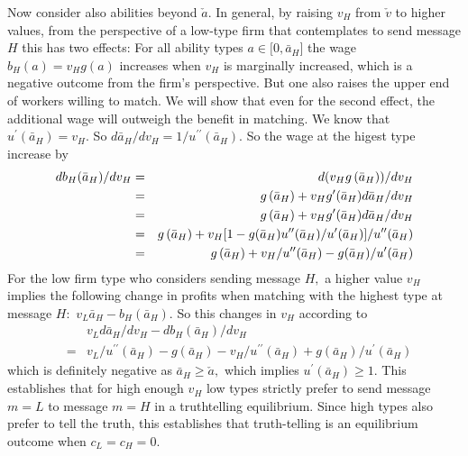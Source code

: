 \documentclass[12pt]{article}
\begin{document}
Now consider also abilities beyond $\check{a}.$ In general, by raising $%
v_{H} $ from $\check{v}$ to higher values, from the perspective of a
low-type firm that contemplates to send message $H$ this has two effects:
For all ability types $a\in \lbrack 0,\bar{a}_{H}]$ the wage $%
b_{H}(a)=v_{H}g(a)$ increases when $v_{H}$ is marginally increased, which is
a negative outcome from the firm's perspective. But one also raises the
upper end of workers willing to match. We will show that even for the second
effect, the additional wage will outweigh the benefit in matching. We know
that $u^{\prime }(\bar{a}_{H})=v_{H}.$ So $d\bar{a}_{H}/dv_{H}=1/u^{\prime
\prime }(\bar{a}_{H}).$ So the wage at the higest type increase by 
\begin{eqnarray*}
db_{H}(\bar{a}_{H})/dv_{H} &=&d(v_{H}g\left( \bar{a}_{H}\right) )/dv_{H} \\
&=&g\left( \bar{a}_{H}\right) +v_{H}g^{\prime }(\bar{a}_{H})d\bar{a}%
_{H}/dv_{H} \\
&=&g\left( \bar{a}_{H}\right) +v_{H}g^{\prime }(\bar{a}_{H})d\bar{a}%
_{H}/dv_{H} \\
&=&g\left( \bar{a}_{H}\right) +v_{H}[1-g(\bar{a}_{H})u^{\prime \prime }(\bar{%
a}_{H})/u^{\prime }(\bar{a}_{H})]/u^{\prime \prime }(\bar{a}_{H}) \\
&=&g\left( \bar{a}_{H}\right) +v_{H}/u^{\prime \prime }(\bar{a}_{H})-g(\bar{a%
}_{H})/u^{\prime }(\bar{a}_{H})
\end{eqnarray*}%
For the low firm type who considers sending message $H,$ a higher value $%
v_{H}$ implies the following change in profits when matching with the
highest type at message $H:$ $v_{L}\bar{a}_{H}-b_{H}(\bar{a}_{H}).$ So this
changes in $v_{H}$ according to 
\begin{eqnarray*}
&&v_{L}d\bar{a}_{H}/dv_{H}-db_{H}(\bar{a}_{H})/dv_{H} \\
&=&v_{L}/u^{\prime \prime }(\bar{a}_{H})-g\left( \bar{a}_{H}\right)
-v_{H}/u^{\prime \prime }(\bar{a}_{H})+g(\bar{a}_{H})/u^{\prime }(\bar{a}%
_{H})
\end{eqnarray*}%
which is definitely negative as $\bar{a}_{H}\geq \check{a},$ which implies $%
u^{\prime }(\bar{a}_{H})\geq 1.$ This establishes that for high enough $%
v_{H} $ low types strictly prefer to send message $m=L$ to message $m=H$ in
a truthtelling equilibrium. Since high types also prefer to tell the truth,
this establishes that truth-telling is an equilibrium outcome when $%
c_{L}=c_{H}=0.$
\end{document}
